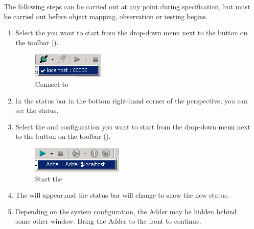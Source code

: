 The following steps can be carried out at any point during specification, 
 but must be carried out before object mapping, observation or testing begins. 

\begin{enumerate}
\item Select the \gdagent you want to start from the drop-down menu next to the   button on the toolbar (). 
\begin{figure}[h]
\begin{center}
\includegraphics{Tutorials/PS/TutConnectServer}
\caption{Connect to \gdagent}
\label{TutConnectServer}
\end{center}
\end{figure}

\item In the status bar in the bottom right-hand corner of the perspective, you can see the \gdagent status. 
\item Select the \gdaut{} and configuration you want to start from the drop-down menu next to the   button on the toolbar ().
\begin{figure}[h]
\begin{center}
\includegraphics{Tutorials/PS/TutStartAUT}
\caption{Start the \gdaut{}}
\label{TutStartAUT}
\end{center}
\end{figure}

\item The \gdaut{} will appear,and the  status 
bar will change to show the new status. 
\item Depending on the system 
configuration, the Adder may be hidden behind some other window. Bring the 
Adder to the front to continue. 
\end{enumerate}
